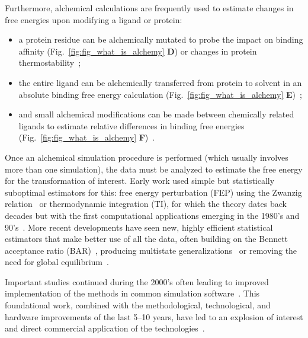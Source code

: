 \documentclass[9pt,bestpractices]{livecoms}
\begin{document}
Furthermore, alchemical calculations are frequently used to estimate changes in free energies upon modifying a ligand or protein: 
\begin{itemize}
\item a protein residue can be alchemically mutated to probe the impact on binding affinity (Fig.~\ref{fig:fig_what_is_alchemy} \textbf{D})\cite{hauser2018predicting,aldeghi2018accurate} or changes in protein thermostability~\cite{seeliger2010protein,gapsys2016insights,gapsys2016accurate,aldeghi2019accurate}; 
\item the entire ligand can be alchemically transferred from protein to solvent in an absolute binding free energy calculation (Fig.~\ref{fig:fig_what_is_alchemy} \textbf{E})~\cite{mobley2007predicting,aldeghi2015accurate,aldeghi2017predictions}; 
\item and small alchemical modifications can be made between chemically related ligands to estimate relative differences in binding free energies (Fig.~\ref{fig:fig_what_is_alchemy} \textbf{F})~\cite{wang2015accurate,mey2016blinded,song2019using,gapsys2020large,kuhn2020automated}.
\end{itemize}
%

Once an alchemical simulation procedure is performed (which usually involves more than one simulation), the data must be analyzed to estimate the free energy for the transformation of interest.
Early work used simple but statistically suboptimal estimators for this: free energy perturbation (FEP) using the Zwanzig relation~\cite{zwanzig1954hightemperature} or thermodynamic integration (TI), for which the theory dates back decades but with the first computational applications emerging in the 1980's and 90's~\cite{kirkwood1935statistical, jorgensen1985monte, kollman1993free, wong1986dynamicsa, merz1989free}. %
More recent developments have seen new, highly efficient statistical estimators that make better use of all the data, often building on the Bennett acceptance ratio (BAR)~\cite{bennett1976efficient}, producing multistate generalizations~\cite{shirts2008statisticallya} or removing the need for global equilibrium~\cite{wu2016multiensemble, mey2014xtram, wu2014statistically}.

Important studies continued during the 2000's often leading to improved implementation of the methods in common simulation software~\cite{shirts2003extremely,shirts2005solvation,vanderspoel2005gromacs, mermelstein2018fast, wang2015accurate, hedges2019biosimspace}. 
This foundational work, combined with the methodological, technological, and hardware improvements of the last 5--10 years, have led to an explosion of interest and direct commercial application of the technologies~\cite{wang2015accurate, fratev2019improved, schindler2020largescale, cournia2017relative, sherborne2016collaborating}.
%
\end{document}
